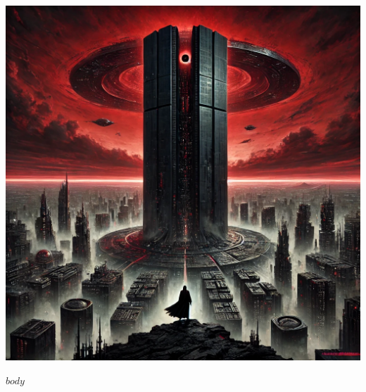 \documentclass[12pt]{book}
\begin{document}
\thispagestyle{plain}
\begin{center}
    \includegraphics[width=\textwidth]{portada.png} %
\end{center}

$body$
\end{document}
